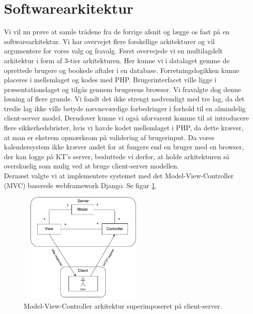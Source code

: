 \documentclass[12pt]{article}   %
\begin{document}
\section{Softwarearkitektur}

Vi vil nu prøve at samle trådene fra de forrige afsnit og lægge os fast på en softwarearkitektur. Vi har overvejet flere forskellige arkitekturer og vil argumentere for vores valg og fravalg. Først overvejede vi en multilagdelt arkitektur i form af 3-tier arkitekturen. Her kunne vi i
datalaget gemme de oprettede brugere og bookede aftaler i en database. Forretningslogikken kunne placeres i mellemlaget og kodes med PHP. Brugerinterfacet ville ligge i præsentationslaget og tilgås gennem brugerens
browser. Vi fravalgte dog denne løsning af flere grunde. Vi fandt det ikke strengt nødvendigt med tre lag, da det tredie lag ikke ville betyde nævneværdige forbedringer i forhold til en almindelig client-server model. Derudover kunne vi også uforvarent komme til at introducere flere sikkerhedsbrister, hvis vi havde kodet mellemlaget i PHP, da dette kræver, at 
man er ekstrem opmærksom på validering af brugerinput. Da vores kalendersystem ikke kræver andet for at fungere end en bruger med en browser, der kan logge på KT's server, besluttede vi derfor, at holde arkitekturen så overskuelig som mulig ved at bruge client-server modellen. \\
Dernæst valgte vi at implementere systemet med det Model-View-Controller (MVC) baserede webframework Django. Se figur \ref{fig:mvc}.\\

\begin{figure}[!ht]
	\centering
\includegraphics[width=6.5cm, height=5.5cm]{mvc.pdf}
\caption{Model-View-Controller arkitektur superimposeret på client-server.}
\label{fig:mvc}
\end{figure}
\end{document}
